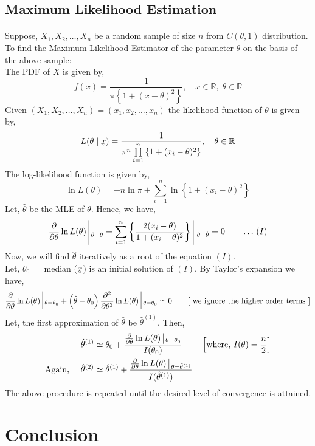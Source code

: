 \documentclass[12pt, fleqn, a4paper]{article}
\def\curl#1{\underaccent{\tilde}{#1}}
\begin{document}
	\subsection{Maximum Likelihood Estimation}
	\paragraph{} Suppose, \(X_1,X_2,\ldots,X_n\) be a random sample of size \(n\) from \(C(\theta,1)\) distribution. To find the Maximum Likelihood Estimator of the parameter \(\theta\) on the basis of the above sample: \\
	The PDF of \(X\) is given by, $$ f(x)=\frac{1}{\pi\left\{1+ (x-\theta)^2\right\}},\quad x\in\mathbb{R},\;\theta\in \mathbb{R} $$ Given \((X_1,X_2,\ldots,X_n)=(x_1,x_2, \ldots,x_n)\) the likelihood function of \(\theta\) is given by, $$ L(\theta\mid \curl{x})=\frac{1}{\pi^n\prod \limits_{i=1}^{n}\left\{1+(x_i-\theta)^2\right\}},\quad
	\theta\in\mathbb{R} $$ The log-likelihood function is given by, $$ \ln L(\theta)=-n\ln\pi+\sum_{i=1}^{n}\ln\left\{1+ (x_i-\theta)^2\right\} $$ Let, \(\hat{\theta}\) be the MLE of \(\theta\). Hence, we have, $$ \frac{\partial}{\partial \theta}\ln L(\theta)\;\vrule_{\;\theta=\hat{\theta}}= \sum_{i=1}^n \left\{\frac{2(x_i-\theta)}{1+(x_i-\theta)^2} \right\} \;\vrule_{\;\theta=\hat{\theta}}=0\qquad\ldots\, (I) $$ Now, we will find \(\hat{\theta}\) iteratively as a root of the equation \((I)\). \\ Let, \(\theta_0=\) median (\(\curl{x}\)) is an initial solution of \((I)\).
	By Taylor's expansion we have, 
	\[\frac{\partial}{\partial\theta}\ln L(\theta)\;\vrule_{ \;\theta=\theta_0}+\left(\hat{\theta}-\theta_0\right)\frac{\partial^2}{\partial\theta^2}\ln L(\theta)\;\vrule_{\; \theta= \theta_0}\simeq0 \qquad \text{[ we ignore the higher order terms ]}\] Let, the first approximation of \(\hat{\theta}\) be \(\hat{\theta}^{(1)}\). Then, 
	\begin{align*}
		&\quad\hat{\theta}^{(1)}\simeq\theta_0+\frac{\frac{\partial}{\partial\theta}\ln L(\theta)\;\vrule_{ \;\theta=\theta_0}}{I(\theta_0)}&&\left[\text{where, }I(\theta)=\frac{n}{2}\right] \\
		\text{Again, }&\quad \hat{\theta}^{(2)}\simeq\hat{\theta}^{(1)}+\frac{\frac{\partial}{\partial\theta}\ln L(\theta)\;\vrule_{ \;\theta=\hat{\theta}^{(1)}}}{I(\hat{\theta}^{(1)})}
	\end{align*}
	The above procedure is repeated until the desired level of convergence is attained.
	
	\section{Conclusion}
\end{document}
